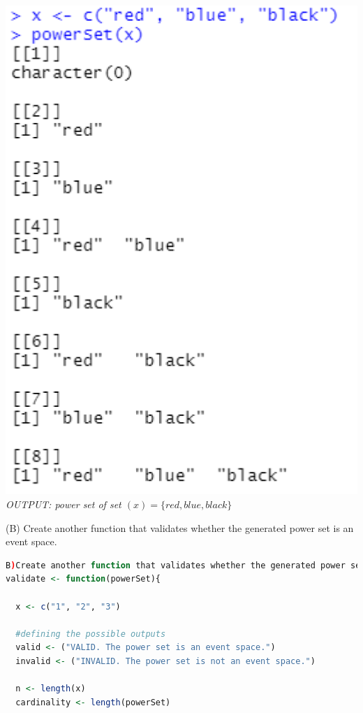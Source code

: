 \documentclass[12pt,letterpaper]{article}
\begin{document}
\begin{enumerate}[label=\Alph*]
\begin{center}
\includegraphics[scale=0.4]{fig4.1}\\
\textit{\footnotesize OUTPUT: power set of set $(x) = \{red, blue, black\}$}
\end{center}  

(B) Create another function that validates whether the generated power set is an event space.
\begin{lstlisting}[language=R]
B)Create another function that validates whether the generated power set is an event space.
validate <- function(powerSet){

  x <- c("1", "2", "3")
  
  #defining the possible outputs
  valid <- ("VALID. The power set is an event space.")
  invalid <- ("INVALID. The power set is not an event space.")
  
  n <- length(x)
  cardinality <- length(powerSet)
  

\end{lstlisting}
\end{enumerate}
\end{document}
